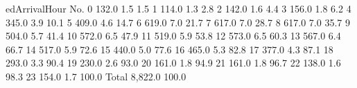 edArrivalHour	No.	%
0	132.0	1.5	1.5
1	114.0	1.3	2.8
2	142.0	1.6	4.4
3	156.0	1.8	6.2
4	345.0	3.9	10.1
5	409.0	4.6	14.7
6	619.0	7.0	21.7
7	617.0	7.0	28.7
8	617.0	7.0	35.7
9	504.0	5.7	41.4
10	572.0	6.5	47.9
11	519.0	5.9	53.8
12	573.0	6.5	60.3
13	567.0	6.4	66.7
14	517.0	5.9	72.6
15	440.0	5.0	77.6
16	465.0	5.3	82.8
17	377.0	4.3	87.1
18	293.0	3.3	90.4
19	230.0	2.6	93.0
20	161.0	1.8	94.9
21	161.0	1.8	96.7
22	138.0	1.6	98.3
23	154.0	1.7	100.0
Total	8,822.0	100.0	

